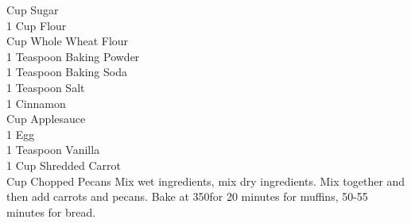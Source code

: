{ Cup Sugar \\
 1 Cup Flour \\
  Cup Whole Wheat Flour \\
 1 Teaspoon Baking Powder \\
 1 Teaspoon Baking Soda \\
 1 Teaspoon Salt \\
 1 Cinnamon \\
  Cup Applesauce \\
 1 Egg \\
 1 Teaspoon Vanilla \\
 1 Cup Shredded Carrot \\
  Cup Chopped Pecans}
{Mix wet ingredients, mix dry ingredients. Mix together and then add carrots and pecans. Bake at 350\degree for 20 minutes for muffins, 50-55 minutes for bread.}
